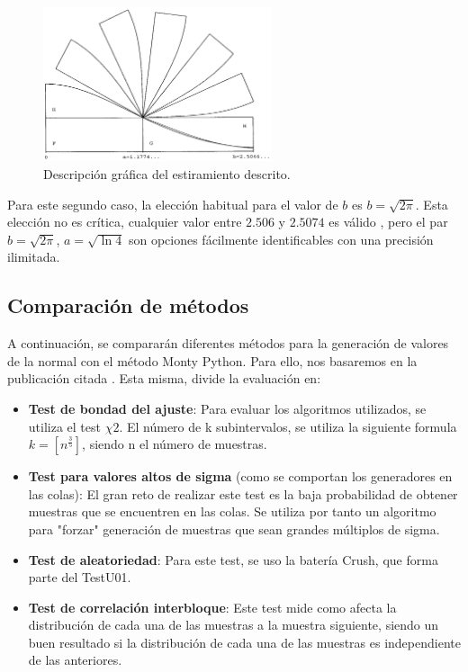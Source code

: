 \documentclass[a4paper,12pt]{article}
\begin{document}
	\begin{figure}[H]
		\centering
		\includegraphics[width=0.6\textwidth]{include/stretching_sigmoid.png}
		\caption{Descripción gráfica del estiramiento descrito. \cite{monty-python}}
	\end{figure}
	
	Para este segundo caso, la elección habitual para el valor de $b$ es $b= \sqrt{2\pi}$. Esta elección no es crítica, cualquier valor entre $2.506$ y $2.5074$ es válido \cite{monty-python}, pero el par $b=\sqrt{2\pi}$, $a = \sqrt{\ln 4}$ son opciones fácilmente identificables con una precisión ilimitada.
	
	
\newpage
	\subsection{Comparación de métodos}
	A continuación, se compararán diferentes métodos para la generación de valores de la normal con el método Monty Python. Para ello, nos basaremos en la publicación citada \cite{comparacion-metodos}. Esta misma, divide la evaluación en:

	
	\begin{itemize}

		\item \textbf{Test de bondad del ajuste}: Para evaluar los algoritmos utilizados, se utiliza el test $\chi{2}$. El número de k subintervalos, se utiliza la siguiente formula $k=[n^{\frac{3}{5}}]$, siendo n el número de muestras.

		\item \textbf{Test para valores altos de sigma} (como se comportan los generadores en las colas): El gran reto de realizar este test es la baja probabilidad de obtener muestras que se encuentren en las colas. Se utiliza por tanto un algoritmo para "forzar" generación de muestras que sean grandes múltiplos de sigma. 

		\item \textbf{Test de aleatoriedad}: Para este test, se uso la batería Crush, que forma parte del TestU01.

		\item \textbf{Test de correlación interbloque}: Este test mide como afecta la distribución de cada una de las muestras a la muestra siguiente, siendo un buen resultado si la distribución de cada una de las muestras es independiente de las anteriores.

	\end{itemize}
\end{document}
